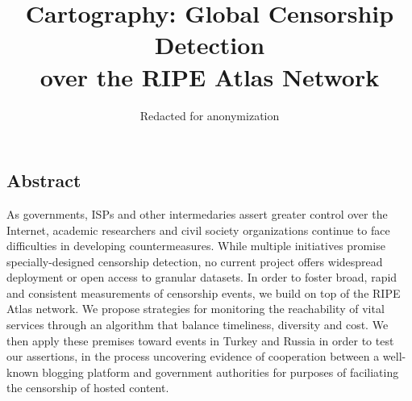 \documentclass[letterpaper,twocolumn,10pt]{article}
\begin{document}
\date{}

\title{
	\Large \bf Cartography: Global Censorship Detection \\
	over the RIPE Atlas Network
}

\author{
	Redacted for anonymization
}

\maketitle

\thispagestyle{empty}

\subsection*{Abstract}

As governments, ISPs and other intermedaries assert greater control over the
Internet, academic researchers and civil society organizations continue to face
difficulties in developing countermeasures.  While multiple initiatives promise
specially-designed censorship detection, no current project offers widespread
deployment or open access to granular datasets.
%
In order to foster broad, rapid and consistent measurements of censorship
events, we build on top of the RIPE Atlas network.  We propose strategies for
monitoring the reachability of vital services through an algorithm that balance
timeliness, diversity and cost.  We then apply these premises toward events in
Turkey and Russia in order to test our assertions, in the process uncovering
evidence of cooperation between a well-known blogging platform and government
authorities for purposes of faciliating the censorship of hosted content.






% 



%



% 

\raggedright
\printbibliography

\end{document}
